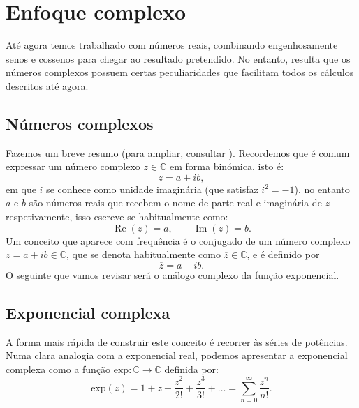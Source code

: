 \section{Enfoque complexo}\label{s:s3}
Até agora temos trabalhado com números reais, combinando engenhosamente senos e cossenos para chegar ao resultado pretendido. No entanto, resulta que os números complexos possuem certas peculiaridades que facilitam todos os cálculos descritos até agora.

\subsection{Números complexos}
Fazemos um breve resumo (para ampliar, consultar \cite{Agarwal}). Recordemos que é comum expressar um número complexo $z\in\mathbb{C}$ em forma binómica, isto é:
\[
z = a + ib,
\]
em que $i$ se conhece como unidade imaginária (que satisfaz $i^2=-1$), no entanto $a$ e $b$ são números reais que recebem o nome de parte real e imaginária de $z$ respetivamente, isso escreve-se habitualmente como:
\[
\operatorname{Re} (z) = a, \qquad \operatorname{Im} (z) = b.
\]
Um conceito que aparece com frequência é o conjugado de um número complexo $z=a+ib\in\mathbb{C}$, que se denota habitualmente como $\overline{z}\in \mathbb{C}$, e é definido por
\begin{equation}
  \label{eq:Conjugado}
  \overline{z} = a - ib.
\end{equation}
O seguinte que vamos revisar será o análogo complexo da função exponencial.

\subsection{Exponencial complexa}
A forma mais rápida de construir este conceito é recorrer às séries de potências. Numa clara analogia com a exponencial real, podemos apresentar a exponencial complexa como a função $\text{exp}:\mathbb{C}\longrightarrow \mathbb{C}$ definida por:
\begin{equation}
  \label{eq:DefinicionExponencial}
  \text{exp}(z) = 1 + z + \frac{z^2}{2!} + \frac{z^3}{3!} + \ldots = \sum_{n=0}^\infty \frac{z^n}{n!}.
\end{equation}


